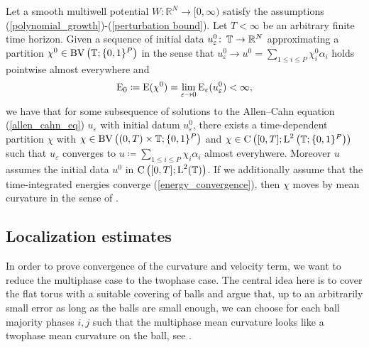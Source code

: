 	\begin{theorem}
		\label{convergence_to_multiphase_mcf}
		Let a smooth multiwell potential $ W \colon \mathbb{ R }^{ N } \to [ 0, 
		\infty ) $ satisfy the assumptions 
		(\ref{polynomial_growth})-(\ref{perturbation bound}). Let $ T < \infty 
		$ be an arbitrary finite time horizon. Given a sequence of initial data 
		$ u_{ \varepsilon }^{ 0 } \colon \operatorname{\mathbb{T}} \to \mathbb{ R }^{ N } $ 
		approximating a partition 
		$ \chi^{ 0 } \in \operatorname{BV} \left( \operatorname{\mathbb{T}} ; \{ 0 , 1 \}^{ P } \right) $ 
		in the sense that 
		$ u_{ \varepsilon }^{ 0 } \to u^{ 0 } =  \sum_{ 1 \leq i \leq P } 
		\chi_{ i }^{ 0 } \alpha_{ i } $ 
		holds pointwise almost everywhere and 
		\begin{equation*} 
		\operatorname{E}_{ 0 } 
		\coloneqq 
		\operatorname{E} ( \chi^{ 0 } ) 
		= 
		\lim_{ \varepsilon \to 0 } 
			\operatorname{E}_{ \varepsilon } ( u_{ \varepsilon }^{ 0 } ) 
		< 
		\infty,
		\end{equation*}
		we have that for 
		some subsequence of solutions to the Allen--Cahn equation
		(\ref{allen_cahn_eq}) $ u_{\varepsilon } $ with initial datum $ u_{ 
		\varepsilon }^{ 0 } $, there exists a time-dependent partition $ \chi $ 
		with 
		$ \chi \in \operatorname{BV} \left( ( 0 , T ) \times \operatorname{\mathbb{T}} ; \{ 0 , 1 \}^{ P } 
		\right) $ and
		$ \chi 
		\in \operatorname{C} \left( [ 0 , T ] ; \operatorname{L}^{ 2 } \left( \operatorname{\mathbb{T}} ;  \{ 0 , 1 
		\}^{ P } \right) \right) $ such that $ u_{ \varepsilon } $ converges to 
		$ u \coloneqq \sum_{ 1 \leq i \leq P } \chi_{ i } \alpha_{ i } $ almost 
		everyhwere. Moreover $ u $ assumes the initial data $ u^{ 0 } $ in $ 
		\operatorname{C} \left( [ 0, T ] ; \operatorname{L}^{ 2 }( \operatorname{\mathbb{T}} ) \right) $. If we 
		additionally assume that the 
		time-integrated energies converge (\ref{energy_convergence}), then $ 
		\chi $ moves by mean curvature in the sense of .
	\end{theorem} 
	
\subsection{Localization estimates}
\label{section_localization_estimates}
In order to prove convergence of the curvature and velocity term, we want to reduce the multiphase case to the twophase case. The central idea here is to cover the flat torus with a suitable covering of balls and argue that, up to an arbitrarily small error as long as the balls are small enough, we can choose for each ball majority phases $ i, j $ such that the multiphase mean curvature looks like a twophase mean curvature on the ball, see .

